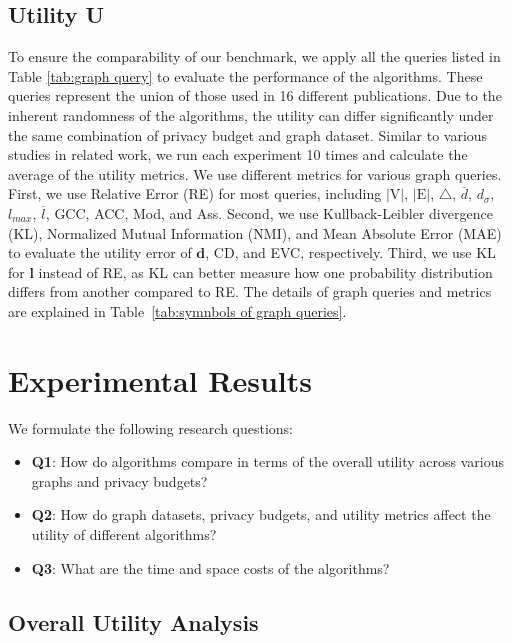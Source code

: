 \documentclass[conference]{IEEEtran}
\theoremstyle{plain}
\begin{document}
\subsection{Utility \textbf{U}}
To ensure the comparability of our benchmark, we apply all the queries listed in Table \ref{tab:graph query} to evaluate the performance of the algorithms. 
These queries represent the union of those used in 16 different publications. 
Due to the inherent randomness of the algorithms, the utility can differ significantly under the same combination of privacy budget and graph dataset.
Similar to various studies in related work, we run each experiment 10 times and calculate the average of the utility metrics. 
We use different metrics for various graph queries. 
First, we use Relative Error (RE) for most queries, including $|\text{V}|$, $|\text{E}|$, $\triangle$, $\overline{d}$, $d_{\sigma}$, $l_{max}$, $\overline{l}$, GCC, ACC, Mod, and Ass. 
Second, we use Kullback-Leibler divergence (KL), Normalized Mutual Information (NMI), and Mean Absolute Error (MAE) to evaluate the utility error of $\bm{d}$, CD, and EVC, respectively. 
Third, we use KL for $\bm{l}$ instead of RE, as KL can better measure how one probability distribution differs from another compared to RE.
The details of graph queries and metrics are explained in Table~\ref{tab:symnbols of graph queries}.

\section{Experimental Results}
\label{sec:experiment}

We formulate the following research questions:
\begin{itemize}
  \item \textbf{Q1}: 
  How do algorithms compare in terms of the overall utility across various graphs and privacy budgets?
  \item \textbf{Q2}: 
   How do graph datasets, privacy budgets, and utility metrics affect the utility of different algorithms?
  \item \textbf{Q3}: What are the time and space costs of the algorithms?
\end{itemize}

\subsection{Overall Utility Analysis}
\end{document}
